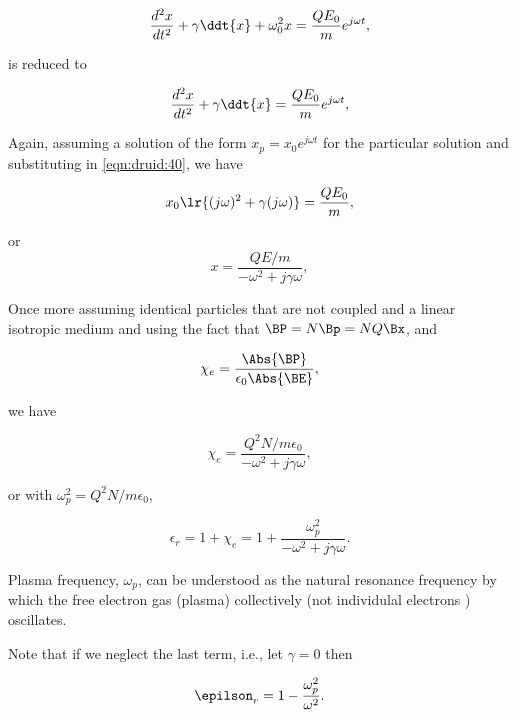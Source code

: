 \begin{dmath}\label{eqn:druid:20}
\frac{d^2 x}{dt^2} + \gamma \ddt{x} + \omega_0^2 x = \frac{Q E_0}{m} e^{j \omega t},
\end{dmath}

is reduced to

\begin{dmath}\label{eqn:druid:40}
\frac{d^2 x}{dt^2} + \gamma \ddt{x} = \frac{Q E_0}{m} e^{j \omega t},
\end{dmath}

Again, assuming a solution of the form \( x_p = x_0 e^{j \omega t} \) for the particular solution and substituting in \cref{eqn:druid:40}, we have

\begin{dmath}\label{eqn:druid:80}
x_0 \lr{ (j\omega)^2 + \gamma (j \omega)} = \frac{Q E_0}{m},
\end{dmath}

or
\begin{dmath}\label{eqn:druid:60}
x 
= 
\frac{Q E/m}{-\omega^2 + j \gamma \omega },
\end{dmath}

Once more assuming identical particles that are not coupled and a linear isotropic medium and using the fact that \( \BP = N \Bp = N Q \Bx \), and

\begin{dmath}\label{eqn:druid:100}
\chi_e = \frac{\Abs{\BP}}{\epsilon_0 \Abs{\BE} }, 
\end{dmath}

we have

\begin{dmath}\label{eqn:druid:120}
\chi_e 
=
\frac{Q^2 N/m \epsilon_0}{-\omega^2 + j \gamma \omega },
\end{dmath}

or with \( \omega_p^2 = Q^2 N/m\epsilon_0\),

\begin{dmath}\label{eqn:druid:140}
\epsilon_r 
= 1 + \chi_e 
= 
1+
\frac{\omega_p^2}{-\omega^2 + j \gamma \omega }.
\end{dmath}

Plasma frequency, \( \omega_p \), can be understood as the natural resonance frequency by which the free electron gas (plasma) collectively (not individulal electrons ) oscillates.

Note that if we neglect the last term, i.e., let \( \gamma = 0 \) then

\begin{dmath}\label{eqn:druid:160}
\epilson_r = 1 - \frac{\omega_p^2}{\omega^2}.
\end{dmath}


